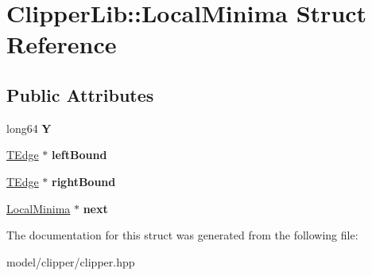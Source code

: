 \hypertarget{structClipperLib_1_1LocalMinima}{\section{Clipper\-Lib\-:\-:Local\-Minima Struct Reference}
\label{structClipperLib_1_1LocalMinima}
}
\subsection*{Public Attributes}
\begin{DoxyCompactItemize}
\item 
\hypertarget{structClipperLib_1_1LocalMinima_aa742a79c0ce808e896f28db5d5250c48}{long64 {\bfseries Y}}\label{structClipperLib_1_1LocalMinima_aa742a79c0ce808e896f28db5d5250c48}

\item 
\hypertarget{structClipperLib_1_1LocalMinima_a9325e1ed560c430a60cc677cd7c4266e}{\hyperlink{structClipperLib_1_1TEdge}{T\-Edge} $\ast$ {\bfseries left\-Bound}}\label{structClipperLib_1_1LocalMinima_a9325e1ed560c430a60cc677cd7c4266e}

\item 
\hypertarget{structClipperLib_1_1LocalMinima_a458b140addcaf1d7bc4b2fe2d3ca81f4}{\hyperlink{structClipperLib_1_1TEdge}{T\-Edge} $\ast$ {\bfseries right\-Bound}}\label{structClipperLib_1_1LocalMinima_a458b140addcaf1d7bc4b2fe2d3ca81f4}

\item 
\hypertarget{structClipperLib_1_1LocalMinima_adc944a3044f14e476f4b4ea4d5403ceb}{\hyperlink{structClipperLib_1_1LocalMinima}{Local\-Minima} $\ast$ {\bfseries next}}\label{structClipperLib_1_1LocalMinima_adc944a3044f14e476f4b4ea4d5403ceb}

\end{DoxyCompactItemize}


The documentation for this struct was generated from the following file\-:\begin{DoxyCompactItemize}
\item 
model/clipper/clipper.\-hpp\end{DoxyCompactItemize}
